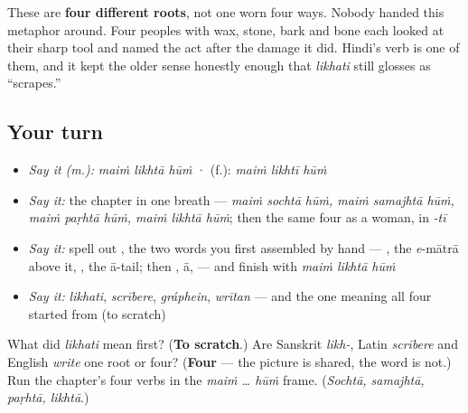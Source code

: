 These are \textbf{four different roots}, not one worn four ways. Nobody handed this metaphor around. Four peoples with wax, stone, bark and bone each looked at their sharp tool and named the act after the damage it did. Hindi's verb is one of them, and it kept the older sense honestly enough that \emph{likhati} still glosses as \textquotedblleft{}scrapes.\textquotedblright{}

\subsection*{Your turn}
\begin{itemize}
\raggedright
  \item \emph{Say it (m.):} \emph{maiṁ likhtā hūṁ}  ·  (f.): \emph{maiṁ likhtī hūṁ}
  \item \emph{Say it:} the chapter in one breath — \emph{maiṁ sochtā hūṁ, maiṁ samajhtā hūṁ, maiṁ paṛhtā hūṁ, maiṁ likhtā hūṁ}; then the same four as a woman, in \emph{-tī}
  \item \emph{Say it:} spell out \textbf{ }, the two words you first assembled by hand — , the \emph{e}-mātrā above it, , the ā-tail; then , ā,  — and finish with \emph{maiṁ likhtā hūṁ}
  \item \emph{Say it:} \emph{likhati}, \emph{scrībere}, \emph{gráphein}, \emph{wrītan} — and the one meaning all four started from (to scratch)
\end{itemize}

\begin{tcolorbox}[breakable,colback=teal!4,colframe=teal!35!black,title={Before you move on}]
What did \emph{likhati} mean first? (\textbf{To scratch}.) Are Sanskrit \emph{likh-}, Latin \emph{scrībere} and English \emph{write} one root or four? (\textbf{Four} — the picture is shared, the word is not.) Run the chapter's four verbs in the \emph{maiṁ … hūṁ} frame. (\emph{Sochtā, samajhtā, paṛhtā, likhtā}.)
\end{tcolorbox}
